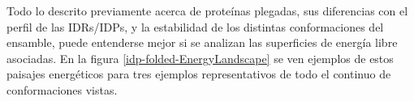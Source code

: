 % 

















Todo lo descrito previamente acerca de proteínas plegadas, sus diferencias con el perfil de las IDRs/IDPs, y la estabilidad de los distintas conformaciones del ensamble, 
puede entenderse mejor si se analizan las superficies de energía libre asociadas. 
En la figura \ref{idp-folded-EnergyLandscape} se ven ejemplos de estos paisajes energéticos para tres ejemplos representativos de todo el continuo de conformaciones vistas.

